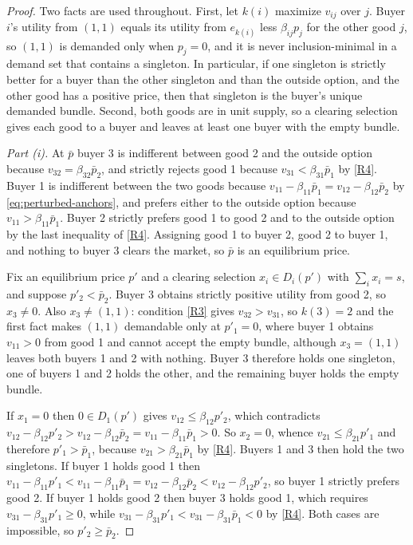 \begin{proof}
Two facts are used throughout. First, let $k(i)$ maximize $v_{ij}$ over $j$. Buyer $i$'s utility from $(1,1)$ equals its utility from $e_{k(i)}$ less $\beta_{ij}p_j$ for the other good $j$, so $(1,1)$ is demanded only when $p_j=0$, and it is never inclusion-minimal in a demand set that contains a singleton. In particular, if one singleton is strictly better for a buyer than the other singleton and than the outside option, and the other good has a positive price, then that singleton is the buyer's unique demanded bundle. Second, both goods are in unit supply, so a clearing selection gives each good to a buyer and leaves at least one buyer with the empty bundle.

\emph{Part \textup{(i)}.} At $\bar p$ buyer 3 is indifferent between good 2 and the outside option because $v_{32}=\beta_{32}\bar p_2$, and strictly rejects good 1 because $v_{31}<\beta_{31}\bar p_1$ by \ref{R4}. Buyer 1 is indifferent between the two goods because $v_{11}-\beta_{11}\bar p_1=v_{12}-\beta_{12}\bar p_2$ by \eqref{eq:perturbed-anchors}, and prefers either to the outside option because $v_{11}>\beta_{11}\bar p_1$. Buyer 2 strictly prefers good 1 to good 2 and to the outside option by the last inequality of \ref{R4}. Assigning good 1 to buyer 2, good 2 to buyer 1, and nothing to buyer 3 clears the market, so $\bar p$ is an equilibrium price.

Fix an equilibrium price $p'$ and a clearing selection $x_i\in D_i(p')$ with $\sum_ix_i=s$, and suppose $p'_2<\bar p_2$. Buyer 3 obtains strictly positive utility from good 2, so $x_3\ne0$. Also $x_3\ne(1,1)$: condition \ref{R3} gives $v_{32}>v_{31}$, so $k(3)=2$ and the first fact makes $(1,1)$ demandable only at $p'_1=0$, where buyer 1 obtains $v_{11}>0$ from good 1 and cannot accept the empty bundle, although $x_3=(1,1)$ leaves both buyers 1 and 2 with nothing. Buyer 3 therefore holds one singleton, one of buyers 1 and 2 holds the other, and the remaining buyer holds the empty bundle.

If $x_1=0$ then $0\in D_1(p')$ gives $v_{12}\le\beta_{12}p'_2$, which contradicts $v_{12}-\beta_{12}p'_2>v_{12}-\beta_{12}\bar p_2=v_{11}-\beta_{11}\bar p_1>0$. So $x_2=0$, whence $v_{21}\le\beta_{21}p'_1$ and therefore $p'_1>\bar p_1$, because $v_{21}>\beta_{21}\bar p_1$ by \ref{R4}. Buyers 1 and 3 then hold the two singletons. If buyer 1 holds good 1 then $v_{11}-\beta_{11}p'_1<v_{11}-\beta_{11}\bar p_1=v_{12}-\beta_{12}\bar p_2<v_{12}-\beta_{12}p'_2$, so buyer 1 strictly prefers good 2. If buyer 1 holds good 2 then buyer 3 holds good 1, which requires $v_{31}-\beta_{31}p'_1\ge0$, while $v_{31}-\beta_{31}p'_1<v_{31}-\beta_{31}\bar p_1<0$ by \ref{R4}. Both cases are impossible, so $p'_2\ge\bar p_2$.


\end{proof}
